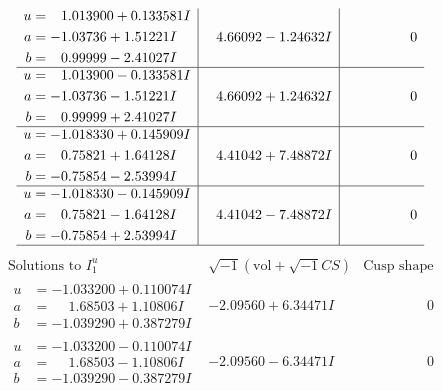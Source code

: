 \documentclass[1p]{elsarticle_modified}
\theoremstyle{definition}
\newcommand{\I}{\sqrt{-1}}
\begin{document}
$$\begin{array}{c|c|c}
\begin{aligned}
u &= \phantom{-}1.013900 + 0.133581 I \\
a &= -1.03736 + 1.51221 I \\
b &= \phantom{-}0.99999 - 2.41027 I\end{aligned}
 & \phantom{-}4.66092 - 1.24632 I & \phantom{-0.000000 } 0 \\ \hline\begin{aligned}
u &= \phantom{-}1.013900 - 0.133581 I \\
a &= -1.03736 - 1.51221 I \\
b &= \phantom{-}0.99999 + 2.41027 I\end{aligned}
 & \phantom{-}4.66092 + 1.24632 I & \phantom{-0.000000 } 0 \\ \hline\begin{aligned}
u &= -1.018330 + 0.145909 I \\
a &= \phantom{-}0.75821 + 1.64128 I \\
b &= -0.75854 - 2.53994 I\end{aligned}
 & \phantom{-}4.41042 + 7.48872 I & \phantom{-0.000000 } 0 \\ \hline\begin{aligned}
u &= -1.018330 - 0.145909 I \\
a &= \phantom{-}0.75821 - 1.64128 I \\
b &= -0.75854 + 2.53994 I\end{aligned}
 & \phantom{-}4.41042 - 7.48872 I & \phantom{-0.000000 } 0\\
 \hline 
 \end{array}$$\newpage$$\begin{array}{c|c|c}  
\text{Solutions to }I^u_{1}& \I (\text{vol} + \sqrt{-1}CS) & \text{Cusp shape}\\
 \hline 
\begin{aligned}
u &= -1.033200 + 0.110074 I \\
a &= \phantom{-}1.68503 + 1.10806 I \\
b &= -1.039290 + 0.387279 I\end{aligned}
 & -2.09560 + 6.34471 I & \phantom{-0.000000 } 0 \\ \hline\begin{aligned}
u &= -1.033200 - 0.110074 I \\
a &= \phantom{-}1.68503 - 1.10806 I \\
b &= -1.039290 - 0.387279 I\end{aligned}
 & -2.09560 - 6.34471 I & \phantom{-0.000000 } 0 \\ \hline\begin{aligned}

\end{aligned}
\end{array}$$
\end{document}
